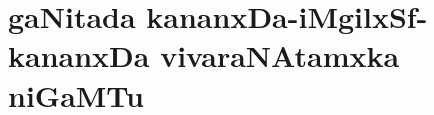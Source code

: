 \makeatletter
\def\@makechapterhead#1{%
  \vspace*{-25\p@}%
  {\parindent \z@ \raggedleft \normalfont
    \ifnum \c@secnumdepth >\m@ne
      \if@mainmatter
        \centering\Large\bfseries \vskip 2pt
        \par\nobreak
        \vskip 1\p@
      \fi
    \fi
    \interlinepenalty\@M
    \huge \bfseries #1\par\nobreak
\vskip 5pt

 \vskip 5\p@  
  }}
\makeatother

\chapter{gaNitada kananxDa-iMgilxSf-kananxDa vivaraNAtamxka niGaMTu}

